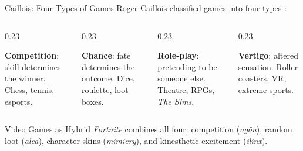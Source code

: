 \documentclass[aspectratio=169,11pt]{beamer}
\begin{document}
\begin{frame}[t]{Caillois: Four Types of Games}
\footnotesize
Roger Caillois classified games into four types \parencite{caillois_man_play}:

\vspace{0.1cm}
\begin{columns}[T]
\begin{column}{0.23\textwidth}
\begin{conceptbox}
\scriptsize
\textbf{Competition}: skill determines the winner. Chess, tennis, esports.
\end{conceptbox}
\end{column}
\begin{column}{0.23\textwidth}
\begin{conceptbox}
\scriptsize
\textbf{Chance}: fate determines the outcome. Dice, roulette, loot boxes.
\end{conceptbox}
\end{column}
\begin{column}{0.23\textwidth}
\begin{conceptbox}
\scriptsize
\textbf{Role-play}: pretending to be someone else. Theatre, RPGs, \emph{The Sims}.
\end{conceptbox}
\end{column}
\begin{column}{0.23\textwidth}
\begin{conceptbox}
\scriptsize
\textbf{Vertigo}: altered sensation. Roller coasters, VR, extreme sports.
\end{conceptbox}
\end{column}
\end{columns}

\vspace{0.15cm}
\begin{alertblock}{Video Games as Hybrid}
\footnotesize
\emph{Fortnite} combines all four: competition (\emph{agôn}), random loot (\emph{alea}), character skins (\emph{mimicry}), and kinesthetic excitement (\emph{ilinx}).
\end{alertblock}
\end{frame}
\end{document}
